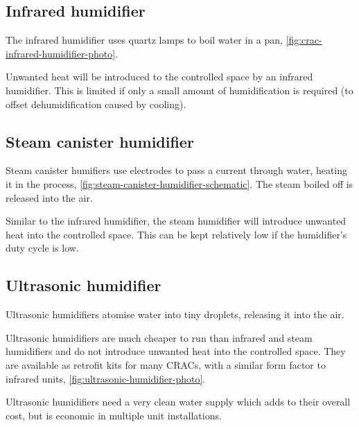 \subsection{Infrared humidifier}
\label{sec:infrared-humidifier}

The infrared humidifier uses quartz lamps to boil water in a pan, \autoref{fig:crac-infrared-humidifier-photo}.


Unwanted heat will be introduced to the controlled space by an infrared humidifier.
This is limited if only a small amount of humidification is required (to offset dehumidification caused by cooling).

\subsection{Steam canister humidifier}
\label{sec:steam-canister-humidifier}

Steam canister humifiers use electrodes to pass a current through water, heating it in the process, \autoref{fig:steam-canister-humidifier-schematic}.
The steam boiled off is released into the air.


Similar to the infrared humidifier, the steam humidifier will introduce unwanted heat into the controlled space.
This can be kept relatively low if the humidifier's duty cycle is low. 

\subsection{Ultrasonic humidifier}
\label{sec:ultrasonic-humidifier}

Ultrasonic humidifiers atomise water into tiny droplets, releasing it into the air.

Ultrasonic humidifiers are much cheaper to run than infrared and steam humidifiers and do not introduce unwanted heat into the controlled space.
They are available as retrofit kits for many CRACs, with a similar form factor to infrared units, \autoref{fig:ultrasonic-humidifier-photo}.


Ultrasonic humidifiers need a very clean water supply which adds to their overall cost, but is economic in multiple unit installations. 





